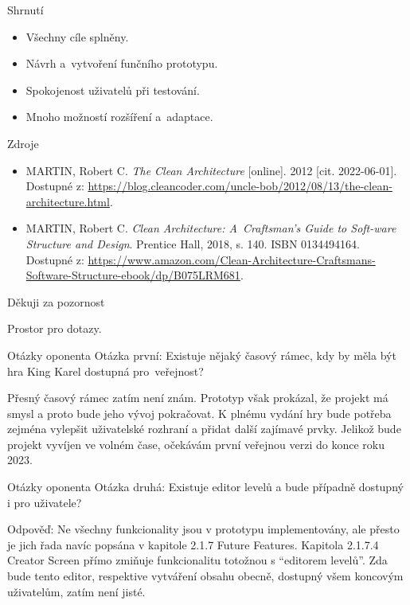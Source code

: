 \documentclass[czech,aspectratio=169]{beamer}
\begin{document}
  \begin{frame}{Shrnutí}
    \begin{itemize}
      \item Všechny cíle splněny.
      \item Návrh a~vytvoření funčního prototypu.
      \item Spokojenost uživatelů při testování.
      \item Mnoho možností rozšíření a~adaptace.
    \end{itemize}
  \end{frame}

  \begin{frame}{Zdroje}
    \begin{itemize}
      \item MARTIN, Robert C. \emph{The Clean Architecture} [online]. 2012 [cit. 2022-06-01]. Dostupné z: \url{https://blog.cleancoder.com/uncle-bob/2012/08/13/the-clean-architecture.html}.
      \item MARTIN, Robert C. \emph{Clean Architecture: A~Craftsman’s Guide to Soft-ware Structure and Design}. Prentice Hall, 2018, s. 140. ISBN 0134494164. Dostupné z: \url{https://www.amazon.com/Clean-Architecture-Craftsmans-Software-Structure-ebook/dp/B075LRM681}. 
    \end{itemize}
  \end{frame}

  \begin{frame}{Děkuji za pozornost}
    \begin{center}
      Prostor pro dotazy.
    \end{center}
  \end{frame}

  \begin{frame}[noframenumbering]{Otázky oponenta}
    Otázka první:
    Existuje nějaký časový rámec, kdy by měla být hra King Karel dostupná pro~veřejnost?

    \vfill

    Přesný časový rámec zatím není znám.
    Prototyp však prokázal, že projekt má smysl a proto bude jeho vývoj pokračovat.
    K plnému vydání hry bude potřeba zejména vylepšit uživatelské rozhraní a přidat další zajímavé prvky.
    Jelikož bude projekt vyvíjen ve volném čase, očekávám první veřejnou verzi do konce roku 2023.
  \end{frame}

  \begin{frame}[noframenumbering]{Otázky oponenta}
    Otázka druhá:
    Existuje editor levelů a bude případně dostupný i pro uživatele?

    \vfill

    Odpověď:
    Ne všechny funkcionality jsou v prototypu implementovány, ale přesto je jich řada navíc popsána v kapitole 2.1.7 Future Features.
    Kapitola 2.1.7.4 Creator Screen přímo zmiňuje funkcionalitu totožnou s \enquote{editorem levelů}.
    Zda bude tento editor, respektive vytváření obsahu obecně, dostupný všem koncovým uživatelům, zatím není jisté.
  \end{frame}
\end{document}
